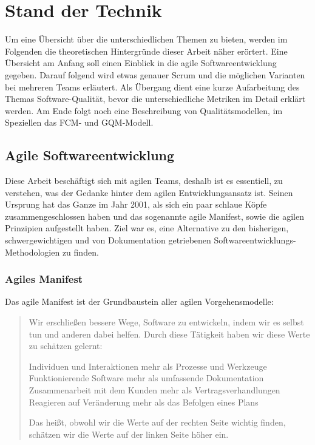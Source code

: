 \chapter{Stand der Technik}

Um eine Übersicht über die unterschiedlichen Themen zu bieten, werden im Folgenden die theoretischen Hintergründe dieser Arbeit näher erörtert.
Eine Übersicht am Anfang soll einen Einblick in die agile Softwareentwicklung gegeben.
Darauf folgend wird etwas genauer Scrum und die möglichen Varianten bei mehreren Teams erläutert.
Als Übergang dient eine kurze Aufarbeitung des Themas Software-Qualität, bevor die unterschiedliche Metriken im Detail erklärt werden.
Am Ende folgt noch eine Beschreibung von Qualitätsmodellen, im Speziellen das \ac{FCM}- und \ac{GQM}-Modell.

\section{Agile Softwareentwicklung}

Diese Arbeit beschäftigt sich mit agilen Teams, deshalb ist es essentiell, zu verstehen, was der Gedanke hinter dem agilen Entwicklungsansatz ist.
Seinen Ursprung hat das Ganze im Jahr 2001, als sich ein paar schlaue Köpfe zusammengeschlossen haben und das sogenannte agile Manifest, sowie die agilen Prinzipien aufgestellt haben.
Ziel war es, eine Alternative zu den bisherigen, schwergewichtigen und von Dokumentation getriebenen Softwareentwicklungs-Methodologien zu finden.

\subsection{Agiles Manifest}

Das agile Manifest ist der Grundbaustein aller agilen Vorgehensmodelle:

\begin{quote}Wir erschließen bessere Wege, Software zu entwickeln,
indem wir es selbst tun und anderen dabei helfen.
Durch diese Tätigkeit haben wir diese Werte zu schätzen gelernt: \newline
\begin{center}
Individuen und Interaktionen mehr als Prozesse und Werkzeuge \newline
Funktionierende Software mehr als umfassende Dokumentation \newline
Zusammenarbeit mit dem Kunden mehr als Vertragsverhandlungen \newline
Reagieren auf Veränderung mehr als das Befolgen eines Plans \newline
\end{center}
Das heißt, obwohl wir die Werte auf der rechten Seite wichtig finden,
schätzen wir die Werte auf der linken Seite höher ein.\end{quote}\cite{agile_manifest}

